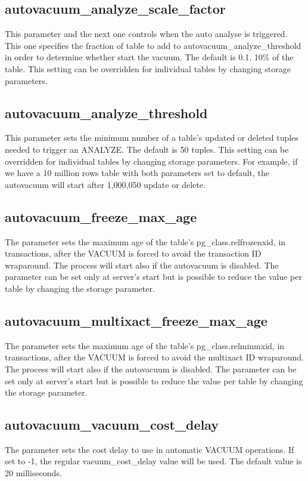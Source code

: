 \subsection{autovacuum\_analyze\_scale\_factor}
This parameter and the next one controls when the auto analyse is triggered. This one specifies the 
fraction of table to add to autovacuum\_analyze\_threshold in order to determine whether start the 
vacuum. The default is 0.1,  10\% of the table. This setting can be overridden for individual 
tables by changing storage parameters.

\subsection{autovacuum\_analyze\_threshold}
This parameter sets the minimum number of a table's updated or deleted tuples needed to trigger an 
ANALYZE. The default is 50 tuples. This setting can be overridden for individual 
tables by changing storage parameters. For example, if we have a 10 million rows table with both 
parameters set to default, the autovacuum will start after 1,000,050 update or delete.

\subsection{autovacuum\_freeze\_max\_age}
The parameter sets the maximum age of the table's pg\_class.relfrozenxid, in transactions, after 
the VACUUM is forced to avoid the transaction ID wraparound. The process will start also if the 
autovacuum is disabled. The parameter can be set only at server's start but is possible to reduce 
the value per table by changing the storage parameter.

\subsection{autovacuum\_multixact\_freeze\_max\_age}
The parameter sets the maximum age of the table's pg\_class.relminmxid, in transactions, after 
the VACUUM is forced to avoid the multixact ID wraparound. The process will start also if the 
autovacuum is 
disabled. The parameter can be set only at server's start but is possible to reduce the value per 
table by changing the storage parameter.

\subsection{autovacuum\_vacuum\_cost\_delay}
The parameter sets the cost delay to use in automatic VACUUM operations. If set to -1, the regular 
vacuum\_cost\_delay value will be used. The default value is 20 milliseconds. 

